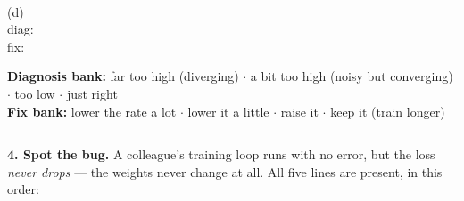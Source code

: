 \documentclass[11pt]{article}
\newif\ifsolution
\newcommand{\blk}[1]{\underline{\hspace{#1}}}
\newcommand{\rb}[2]{\ifsolution\textbf{#1}\else\blk{#2}\fi}
\newcommand{\keybox}[1]{\ifsolution\par\vspace{2pt}%
  \fbox{\parbox{0.965\textwidth}{\small\textbf{Answer.}\; #1}}\par\fi}
\begin{document}
\begin{center}
%
\begin{minipage}[t]{0.235\linewidth}\centering
{}\\[2pt]
{\footnotesize (d)}\\[3pt]
{\scriptsize diag:}\;\rb{a bit high}{1.5cm}\\[4pt]
{\scriptsize fix:}\;\rb{lower a little}{1.5cm}
\end{minipage}
\end{center}

\vspace{2pt}
\begin{center}
{\small \textbf{Diagnosis bank:}\;\; far too high (diverging) \;$\cdot$\; a bit too high (noisy but
converging) \;$\cdot$\; too low \;$\cdot$\; just right \\[2pt]
\textbf{Fix bank:}\;\; lower the rate a lot \;$\cdot$\; lower it a little \;$\cdot$\; raise it
\;$\cdot$\; keep it (train longer)}
\end{center}

\keybox{(a) \textbf{far too high $\rightarrow$ lower the rate a lot}: the swings \emph{grow} and the
loss climbs --- the steps overshoot so badly training is diverging. (b) \textbf{too low
$\rightarrow$ raise it}: the loss barely drops and is still high and still falling at the end;
it would get there eventually but wastes time. (c) \textbf{just right $\rightarrow$ keep it}: a
steep early drop that flattens out low and stays there. (d) \textbf{a bit too high $\rightarrow$
lower it a little}: the loss \emph{is} trending down but bounces noisily on the way --- close to
right, just overshooting slightly. The tell that separates (a) from (d): in (a) the swings grow
and the loss rises; in (d) they shrink and the loss falls.}

\vspace{2pt}\hrule\vspace{5pt}

\textbf{4. Spot the bug.}\; {\small A colleague's training loop runs with no error, but the loss
\emph{never drops} --- the weights never change at all. All five lines are present, in this order:}
\end{document}

